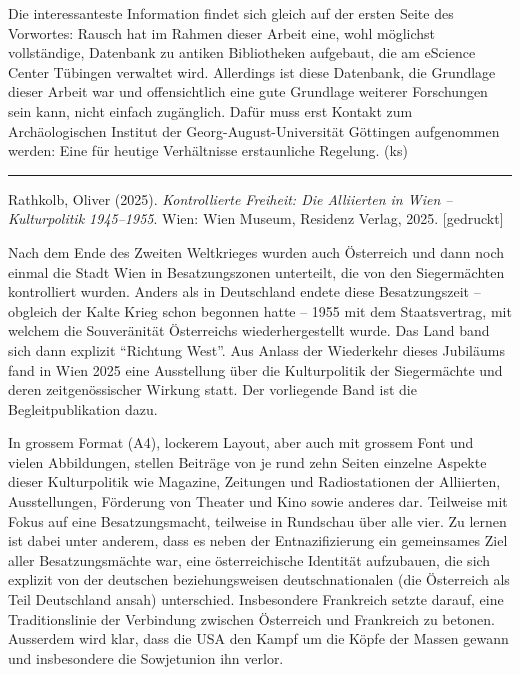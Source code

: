 \documentclass[a4paper,
fontsize=11pt,
oneside,
numbers=noperiodatend,
parskip=half-,
bibliography=totoc,
final
]{scrartcl}
\begin{document}
Die interessanteste Information findet sich gleich auf der ersten Seite
des Vorwortes: Rausch hat im Rahmen dieser Arbeit eine, wohl möglichst
vollständige, Datenbank zu antiken Bibliotheken aufgebaut, die am
eScience Center Tübingen verwaltet wird. Allerdings ist diese Datenbank,
die Grundlage dieser Arbeit war und offensichtlich eine gute Grundlage
weiterer Forschungen sein kann, nicht einfach zugänglich. Dafür muss
erst Kontakt zum Archäologischen Institut der Georg-August-Universität
Göttingen aufgenommen werden: Eine für heutige Verhältnisse erstaunliche
Regelung. (ks)

\begin{center}\rule{0.5\linewidth}{0.5pt}\end{center}

Rathkolb, Oliver (2025). \emph{Kontrollierte Freiheit: Die Alliierten in
Wien -- Kulturpolitik 1945--1955}. Wien: Wien Museum, Residenz Verlag,
2025. {[}gedruckt{]}

Nach dem Ende des Zweiten Weltkrieges wurden auch Österreich und dann
noch einmal die Stadt Wien in Besatzungszonen unterteilt, die von den
Siegermächten kontrolliert wurden. Anders als in Deutschland endete
diese Besatzungszeit -- obgleich der Kalte Krieg schon begonnen hatte --
1955 mit dem Staatsvertrag, mit welchem die Souveränität Österreichs
wiederhergestellt wurde. Das Land band sich dann explizit
\enquote{Richtung West}. Aus Anlass der Wiederkehr dieses Jubiläums fand
in Wien 2025 eine Ausstellung über die Kulturpolitik der Siegermächte
und deren zeitgenössischer Wirkung statt. Der vorliegende Band ist die
Begleitpublikation dazu.

In grossem Format (A4), lockerem Layout, aber auch mit grossem Font und
vielen Abbildungen, stellen Beiträge von je rund zehn Seiten einzelne
Aspekte dieser Kulturpolitik wie Magazine, Zeitungen und Radiostationen
der Alliierten, Ausstellungen, Förderung von Theater und Kino sowie
anderes dar. Teilweise mit Fokus auf eine Besatzungsmacht, teilweise in
Rundschau über alle vier. Zu lernen ist dabei unter anderem, dass es
neben der Entnazifizierung ein gemeinsames Ziel aller Besatzungsmächte
war, eine österreichische Identität aufzubauen, die sich explizit von
der deutschen beziehungsweisen deutschnationalen (die Österreich als
Teil Deutschland ansah) unterschied. Insbesondere Frankreich setzte
darauf, eine Traditionslinie der Verbindung zwischen Österreich und
Frankreich zu betonen. Ausserdem wird klar, dass die USA den Kampf um
die Köpfe der Massen gewann und insbesondere die Sowjetunion ihn verlor.
\end{document}

